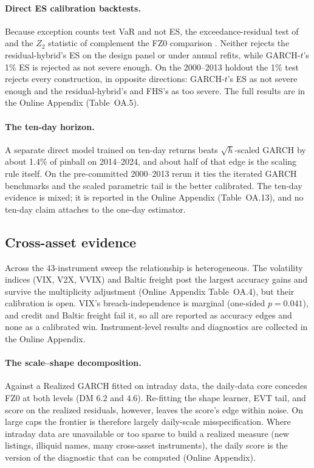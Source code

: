 \documentclass[11pt]{article}
\theoremstyle{remark}
\begin{document}
\paragraph{Direct ES calibration backtests.} Because exception counts test VaR and not ES, the exceedance-residual test of \citet{mcneilfrey2000} and the $Z_2$ statistic of \citet{acerbi2014backtesting} complement the FZ0 comparison \citep{noldeziegel2017elicitability, bayer2022esr}. Neither rejects the residual-hybrid's ES on the design panel or under annual refits, while GARCH-$t$'s 1\% ES is rejected as not severe enough. On the 2000--2013 holdout the 1\% test rejects every construction, in opposite directions: GARCH-$t$'s ES as not severe enough and the residual-hybrid's and FHS's as too severe. The full results are in the Online Appendix (Table~OA.5).

\paragraph{The ten-day horizon.} A separate direct model trained on ten-day returns beats $\sqrt{h}$-scaled GARCH by about 1.4\% of pinball on 2014--2024, and about half of that edge is the scaling rule itself. On the pre-committed 2000--2013 rerun it ties the iterated GARCH benchmarks and the scaled parametric tail is the better calibrated. The ten-day evidence is mixed; it is reported in the Online Appendix (Table~OA.13), and no ten-day claim attaches to the one-day estimator.

\subsection{Cross-asset evidence}

Across the 43-instrument sweep the relationship is heterogeneous. The volatility indices (VIX, V2X, VVIX) and Baltic freight post the largest accuracy gains and survive the multiplicity adjustment (Online Appendix Table~OA.4), but their calibration is open. VIX's breach-independence is marginal (one-sided $p=0.041$), and credit and Baltic freight fail it, so all are reported as accuracy edges and none as a calibrated win. Instrument-level results and diagnostics are
collected in the Online Appendix.

\paragraph{The scale--shape decomposition.} Against a Realized GARCH \citep{hansen2012realized} fitted on intraday data, the daily-data core concedes FZ0 at both levels (DM $6.2$ and $4.6$). Re-fitting the shape learner, EVT tail, and score on the realized residuals, however, leaves the score's edge within noise. On large caps the frontier is therefore largely daily-scale misspecification. Where intraday data are unavailable or too sparse to build a realized measure (new listings, illiquid names, many cross-asset instruments), the daily score is the version of the diagnostic that can be computed (Online Appendix).
\end{document}
